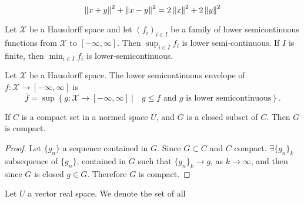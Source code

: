 \begin{lemma}
	
\[
\left\lVert x+y\right\rVert^2 +\left\lVert x-y\right\rVert^2 = 2\left\lVert x\right\rVert^2+2\left\lVert y\right\rVert^2
\]
\end{lemma}

\begin{lemma}
	Let $\mathcal{X}$ be a Hausdorff space and let $(f_i)_{i \in I}$ be a family of lower semicontinuous functions from $\mathcal{X}$ to $[-\infty, \infty]$. Then $\sup_{i\in I}f_i$ is lower semi-continuous. If $I$ is finite, then $\min_{i\in I}f_i$ is lower-semicontinuous.
\end{lemma}
\begin{definition}
	Let $\mathcal{X}$ be a Hausdorff space. The lower semicontinuous envelope of $f: \mathcal{X}\rightarrow[-\infty, \infty]$ is 
	\[
	\overline{f}=\sup \left\lbrace g: \mathcal{X}\rightarrow[-\infty, \infty] \ |\quad  g\leq f \text{ and } g \text{ is lower semicontinuous}\right\rbrace.
	\]
\end{definition}
\begin{proposition}
	If $C$ is a compact set in a normed space $U$, and $G$ is a closed subset of $C$. Then $G$ is compact.
	\begin{proof}
		Let $\{ g_n\}$ a sequence contained in $G$. Since $G \subset C$ and $C$ compact. $\exists \{g_n\}_k$ subsequence of $\{g_n\}$, contained in $G$ such that $\{g_n\}_k \rightarrow g$, as $k \rightarrow \infty$, and then since $G$ is closed $g \in G$. Therefore $G$ is compact.
	\end{proof}
	\label{prop0. closed subset compact. Precompact}
\end{proposition}

\begin{definition}
	Let $U$ a vector real space. We denote the set of all 
\end{definition}



